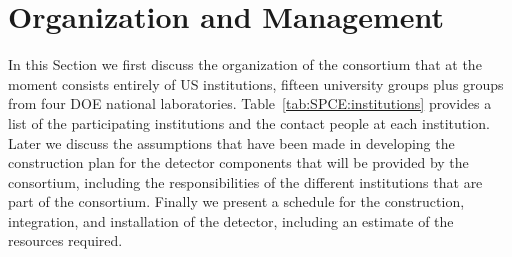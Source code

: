 \section{Organization and Management}
\label{sec:fdsp-tpcelec-management}

In this Section we first discuss the organization of the 
consortium that at the moment consists entirely of US institutions, 
fifteen university groups plus groups from four DOE national 
laboratories. Table~\ref{tab:SPCE:institutions} provides a list 
of the participating institutions and the contact people at each institution. 
Later we discuss the assumptions that have been made in developing
the construction plan for the detector components that will be
provided by the  consortium, including the responsibilities
of the different institutions that are part of the consortium. Finally
we present a schedule for the construction, integration, and installation
of the detector, including an estimate of the resources required.

